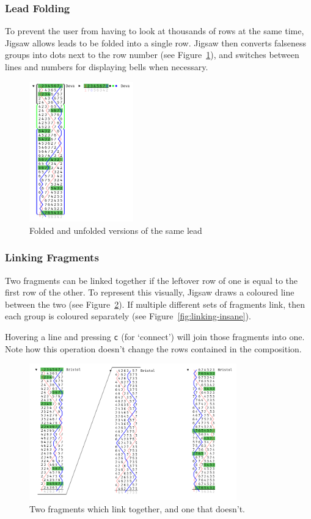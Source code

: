 \documentclass[12pt]{article}
\begin{document}
\subsubsection{Lead Folding}

To prevent the user from having to look at thousands of rows at the same time, Jigsaw allows leads
to be folded into a single row.  Jigsaw then converts falseness groups into dots next to the row
number (see Figure~\ref{fig:lead-folding}), and switches between lines and numbers for displaying
bells when necessary.

\begin{figure}[h!]
    \centering
    \includegraphics[width=0.4\textwidth]{lead-fold-false}
    \caption{Folded and unfolded versions of the same lead}\label{fig:lead-folding}
\end{figure}

\subsubsection{Linking Fragments}

Two fragments can be linked together if the leftover row of one is equal to the first row of the
other.  To represent this visually, Jigsaw draws a coloured line between the two (see
Figure~\ref{fig:linking}).  If multiple different sets of fragments link, then each group is
coloured separately (see Figure~\ref{fig:linking-insane}).

Hovering a line and pressing \verb|c| (for `connect') will join those fragments into one.  Note how
this operation doesn't change the rows contained in the composition.

\begin{figure}
    \centering
    \includegraphics[width=0.8\textwidth]{linking}
    \caption{Two fragments which link together, and one that doesn't.}\label{fig:linking}
\end{figure}
\end{document}
